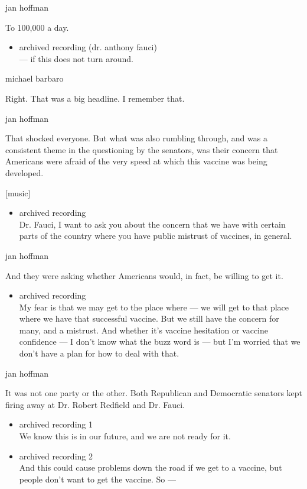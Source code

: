 jan hoffman

To 100,000 a day.

\begin{itemize}
\tightlist
\item
  archived recording (dr. anthony fauci)\\
  --- if this does not turn around.
\end{itemize}

michael barbaro

Right. That was a big headline. I remember that.

jan hoffman

That shocked everyone. But what was also rumbling through, and was a
consistent theme in the questioning by the senators, was their concern
that Americans were afraid of the very speed at which this vaccine was
being developed.

{[}music{]}

\begin{itemize}
\tightlist
\item
  archived recording\\
  Dr. Fauci, I want to ask you about the concern that we have with
  certain parts of the country where you have public mistrust of
  vaccines, in general.
\end{itemize}

jan hoffman

And they were asking whether Americans would, in fact, be willing to get
it.

\begin{itemize}
\tightlist
\item
  archived recording\\
  My fear is that we may get to the place where --- we will get to that
  place where we have that successful vaccine. But we still have the
  concern for many, and a mistrust. And whether it's vaccine hesitation
  or vaccine confidence --- I don't know what the buzz word is --- but
  I'm worried that we don't have a plan for how to deal with that.
\end{itemize}

jan hoffman

It was not one party or the other. Both Republican and Democratic
senators kept firing away at Dr. Robert Redfield and Dr. Fauci.

\begin{itemize}
\item
  archived recording 1\\
  We know this is in our future, and we are not ready for it.
\item
  archived recording 2\\
  And this could cause problems down the road if we get to a vaccine,
  but people don't want to get the vaccine. So ---
\end{itemize}

